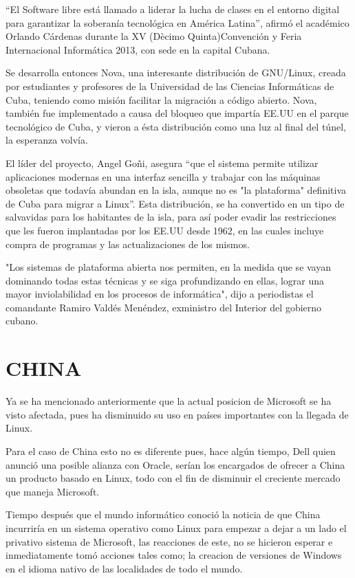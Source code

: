 “El Software libre está llamado a liderar la lucha de clases en el entorno digital para garantizar la soberanía tecnológica en América Latina”, afirmó el académico Orlando 
Cárdenas durante la XV (Dècimo Quinta)Convención y Feria Internacional Informática 2013, con sede en la capital Cubana.

Se desarrolla entonces Nova, una interesante distribución de GNU/Linux,  creada por estudiantes y profesores de la Universidad de las Ciencias Informáticas de Cuba, 
teniendo como misión facilitar la migración a código abierto. Nova, también fue implementado a causa del bloqueo que impartía EE.UU en el parque tecnológico de Cuba, y 
vieron a ésta distribución como una luz al final del túnel, la esperanza volvía.

El líder del proyecto, Angel Goñi, asegura “que el sistema permite utilizar aplicaciones modernas en una interfaz sencilla y trabajar con las máquinas obsoletas que todavía 
abundan en la isla, aunque no es "la plataforma" definitiva de Cuba para migrar a Linux”. Esta distribución, se ha convertido en un tipo de salvavidas para los habitantes 
de la isla, para así poder evadir las restricciones que les fueron implantadas por los EE.UU desde 1962, en las cuales incluye compra de programas y las actualizaciones de 
los mismos.

"Los sistemas de plataforma abierta nos permiten, en la medida que se vayan dominando todas estas técnicas y se siga profundizando en ellas, lograr una mayor inviolabilidad 
en los procesos de informática", dijo a periodistas el comandante Ramiro Valdés Menéndez, exministro del Interior del gobierno cubano.

\section*{CHINA}
Ya se ha mencionado anteriormente que la actual posicion de Microsoft se ha visto afectada, pues ha disminuido su uso en países importantes con la llegada de Linux.

Para el caso de China esto no es diferente pues, hace algún tiempo, Dell quien anunció una posible alianza con Oracle, serían los encargados de ofrecer a China un producto 
basado en Linux, todo con el fin de disminuir el creciente mercado que maneja Microsoft.

Tiempo después que el mundo informático conoció la noticia de que China incurriría en un sistema operativo como Linux para empezar a dejar a un lado el privativo sistema de 
Microsoft, las reacciones de este, no se hicieron esperar e inmediatamente tomó acciones tales como; la creacion de versiones de Windows en el idioma nativo de las 
localidades de todo el mundo.


